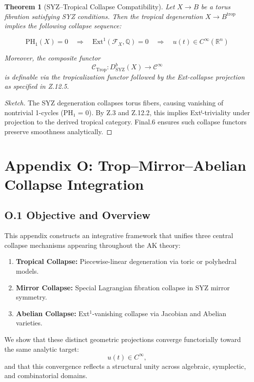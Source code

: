 \documentclass[11pt]{article}
\newtheorem{theorem}{Theorem}[section]
\begin{document}
\begin{axiom}
\begin{axiom}
{{\begin{theorem}[SYZ–Tropical Collapse Compatibility]
Let \( X \to B \) be a torus fibration satisfying SYZ conditions.  
Then the tropical degeneration \( X \to B^{\mathrm{trop}} \) implies the following collapse sequence:

\[
\mathrm{PH}_1(X) = 0 \quad \Rightarrow \quad \mathrm{Ext}^1(\mathcal{F}_X, \mathbb{Q}) = 0 \quad \Rightarrow \quad u(t) \in C^\infty(\mathbb{R}^n)
\]

Moreover, the composite functor
\[
\mathcal{C}_{\mathrm{Trop}} : D^b_{\mathrm{SYZ}}(X) \to \mathcal{C}^\infty
\]
is definable via the tropicalization functor followed by the Ext-collapse projection as specified in Z.12.5.
\end{theorem}

\begin{proof}[Sketch]
The SYZ degeneration collapses torus fibers, causing vanishing of nontrivial 1-cycles (PH₁ = 0).  
By Z.3 and Z.12.2, this implies Extⁱ-triviality under projection to the derived tropical category.  
Final.6 ensures such collapse functors preserve smoothness analytically.
\end{proof}


\section*{Appendix O: Trop--Mirror--Abelian Collapse Integration}

\subsection*{O.1 Objective and Overview}

This appendix constructs an integrative framework that unifies three central collapse mechanisms  
appearing throughout the AK theory:

\begin{enumerate}
  \item \textbf{Tropical Collapse:} Piecewise-linear degeneration via toric or polyhedral models.
  \item \textbf{Mirror Collapse:} Special Lagrangian fibration collapse in SYZ mirror symmetry.
  \item \textbf{Abelian Collapse:} Ext$^1$-vanishing collapse via Jacobian and Abelian varieties.
\end{enumerate}

We show that these distinct geometric projections converge functorially toward the same analytic target:
\[
u(t) \in C^\infty,
\]
and that this convergence reflects a structural unity across algebraic, symplectic, and combinatorial domains.

}}
\end{axiom}
\end{axiom}
\end{document}
